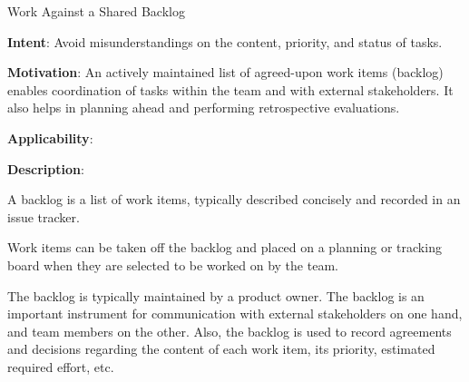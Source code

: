   
  \begin{frame}[plain]{ Work Against a Shared Backlog
 }

  \textbf{Intent}: Avoid misunderstandings on the content, priority, and status of tasks. 
 

  \textbf{Motivation}: An actively maintained list of agreed-upon work items (backlog) enables coordination of tasks within the team and with external stakeholders. It also helps in planning ahead and performing retrospective evaluations.
 

  \textbf{Applicability}: 
 

  \textbf{Description}: 

A backlog is a list of work items, typically described concisely and recorded in an issue tracker.


Work items can be taken off the backlog and placed on a planning or tracking board when they are selected to be worked on by the team.


The backlog is typically maintained by a product owner. The backlog is an important instrument for communication with external stakeholders on one hand, and team members on the other. Also, the backlog is used to record agreements and decisions regarding the content of each work item, its priority, estimated required effort, etc.


 


  \end{frame}

